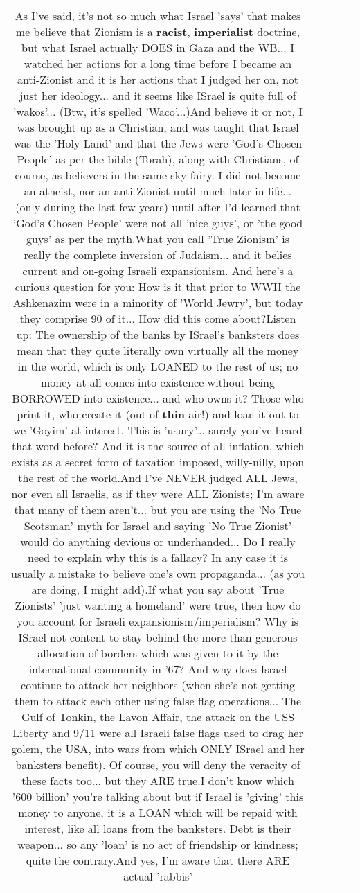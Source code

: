 \documentclass[11pt]{article}
\newlength\mylength
\begin{document}
\begin{center}
\begin{longtable}{|C{.65\mylength}|C{.30\mylength}|C{.12\mylength}|C{.12\mylength}|C{.12\mylength}|}
  \small As I've said, it's not so much what Israel 'says' that makes me believe that Zionism is a \textbf{racist}, \textbf{imperialist} doctrine, but what Israel actually DOES in Gaza and the WB... I watched her actions for a long time before I became an anti-Zionist and it is her actions that I judged her on, not just her ideology... and it seems like ISrael is quite full of 'wakos'... (Btw, it's spelled 'Waco'...)And believe it or not, I was brought up as a Christian, and was taught that Israel was the 'Holy Land' and that the Jews were 'God's Chosen People' as per the bible (Torah), along with Christians, of course, as believers in the same sky-fairy. I did not become an atheist, nor an anti-Zionist until much later in life... (only during the last few years) until after I'd learned that 'God's Chosen People' were not all 'nice guys', or 'the good guys' as per the myth.What you call 'True Zionism' is really the complete inversion of Judaism... and it belies current and on-going Israeli expansionism. And here's a curious question for you: How is it that prior to WWII the Ashkenazim were in a minority of 'World Jewry', but today they comprise 90 of it... How did this come about?Listen up: The ownership of the banks by ISrael's banksters does mean that they quite literally own virtually all the money in the world, which is only LOANED to the rest of us; no money at all comes into existence without being BORROWED into existence... and who owns it? Those who print it, who create it (out of \textbf{thin} air!) and loan it out to we 'Goyim' at interest. This is 'usury'... surely you've heard that word before? And it is the source of all inflation, which exists as a secret form of taxation imposed, willy-nilly, upon the rest of the world.And I've NEVER judged ALL Jews, nor even all Israelis, as if they were ALL Zionists; I'm aware that many of them aren't... but you are using the 'No True Scotsman' myth for Israel and saying 'No True Zionist' would do anything devious or underhanded... Do I really need to explain why this is a fallacy? In any case it is usually a mistake to believe one's own propaganda... (as you are doing, I might add).If what you say about 'True Zionists' 'just wanting a homeland' were true, then how do you account for Israeli expansionism/imperialism? Why is ISrael not content to stay behind the more than generous allocation of borders which was given to it by the international community in '67? And why does Israel continue to attack her neighbors (when she's not getting them to attack each other using false flag operations... The Gulf of Tonkin, the Lavon Affair, the attack on the USS Liberty and 9/11 were all Israeli false flags used to drag her golem, the USA, into wars from which ONLY ISrael and her banksters benefit). Of course, you will deny the veracity of these facts too... but they ARE true.I don't know which '600 billion' you're talking about but if Israel is 'giving' this money to anyone, it is a LOAN which will be repaid with interest, like all loans from the banksters. Debt is their weapon... so any 'loan' is no act of friendship or kindness; quite the contrary.And yes, I'm aware that there ARE actual 'rabbis' 
\end{longtable}
\end{center}
\end{document}
